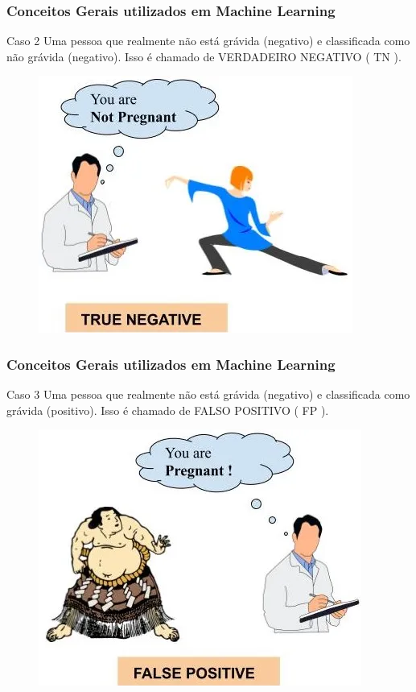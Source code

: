 \documentclass{beamer}
\begin{document}
\begin{frame}
	\frametitle{Conceitos Gerais utilizados em Machine Learning}
	\begin{block}{Caso 2}
		Uma pessoa que realmente não está grávida (negativo) e classificada como não grávida (negativo). Isso é chamado de VERDADEIRO NEGATIVO ( TN ).
	\end{block}
	\begin{figure}
		\centering
		\includegraphics[width=0.4\linewidth]{figures/True_negative}
	\end{figure}
	
\end{frame}
	
\begin{frame}
	\frametitle{Conceitos Gerais utilizados em Machine Learning}
	\begin{block}{Caso 3}
		Uma pessoa que realmente não está grávida (negativo) e classificada como grávida (positivo). Isso é chamado de FALSO POSITIVO ( FP ).
	\end{block}
	\begin{figure}
		\centering
		\includegraphics[width=0.4\linewidth]{figures/false_positive}
	\end{figure}
	
\end{frame}
	
\end{document}
